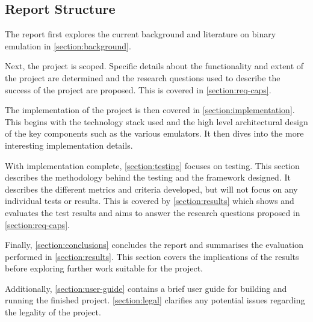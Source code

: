 \subsection{Report Structure}

The report first explores the current background and literature on binary emulation in \autoref{section:background}.

Next, the project is scoped. Specific details about the functionality and extent of the project are determined and the research questions used to describe the success of the project are proposed. This is covered in \autoref{section:req-caps}.

The implementation of the project is then covered in \autoref{section:implementation}. This begins with the technology stack used and the high level architectural design of the key components such as the various emulators. It then dives into the more interesting implementation details.

With implementation complete, \autoref{section:testing} focuses on testing. This section describes the methodology behind the testing and the framework designed. It describes the different metrics and criteria developed, but will not focus on any individual tests or results. This is covered by \autoref{section:results} which shows and evaluates the test results and aims to answer the research questions proposed in \autoref{section:req-caps}.

Finally, \autoref{section:conclusions} concludes the report and summarises the evaluation performed in \autoref{section:results}. This section covers the implications of the results before exploring further work suitable for the project.

Additionally, \autoref{section:user-guide} contains a brief user guide for building and running the finished project. \autoref{section:legal} clarifies any potential issues regarding the legality of the project.